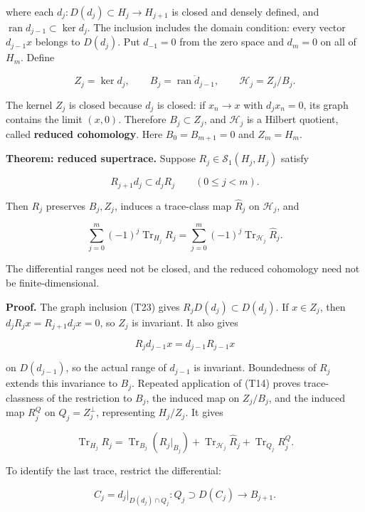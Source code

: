 \documentclass[
  11pt,
]{article}
\begin{document}
where each \(d_j:D(d_j)\subset H_j\to H_{j+1}\) is closed and densely
defined, and \(\operatorname{ran}d_{j-1}\subset\ker d_j\). The inclusion
includes the domain condition: every vector \(d_{j-1}x\) belongs to
\(D(d_j)\). Put \(d_{-1}=0\) from the zero space and \(d_m=0\) on all of
\(H_m\). Define

\[
Z_j=\ker d_j,\qquad B_j=\overline{\operatorname{ran}d_{j-1}},
\qquad \mathcal H_j=Z_j/B_j.                                \tag{T22}
\]

The kernel \(Z_j\) is closed because \(d_j\) is closed: if \(x_n\to x\)
with \(d_jx_n=0\), its graph contains the limit \((x,0)\). Therefore
\(B_j\subset Z_j\), and \(\mathcal H_j\) is a Hilbert quotient, called
\textbf{reduced cohomology}. Here \(B_0=B_{m+1}=0\) and \(Z_m=H_m\).

\textbf{Theorem: reduced supertrace.} Suppose
\(R_j\in\mathcal S_1(H_j,H_j)\) satisfy

\[
R_{j+1}d_j\subset d_jR_j\qquad(0\leq j<m).                   \tag{T23}
\]

Then \(R_j\) preserves \(B_j,Z_j\), induces a trace-class map
\(\widehat R_j\) on \(\mathcal H_j\), and

\[
\sum_{j=0}^m(-1)^j\operatorname{Tr}_{H_j}R_j
=\sum_{j=0}^m(-1)^j\operatorname{Tr}_{\mathcal H_j}\widehat R_j.
                                                                    \tag{T24}
\]

The differential ranges need not be closed, and the reduced cohomology
need not be finite-dimensional.

\textbf{Proof.} The graph inclusion (T23) gives
\(R_jD(d_j)\subset D(d_j)\). If \(x\in Z_j\), then
\(d_jR_jx=R_{j+1}d_jx=0\), so \(Z_j\) is invariant. It also gives

\[
R_jd_{j-1}x=d_{j-1}R_{j-1}x
\]

on \(D(d_{j-1})\), so the actual range of \(d_{j-1}\) is invariant.
Boundedness of \(R_j\) extends this invariance to \(B_j\). Repeated
application of (T14) proves trace-classness of the restriction to
\(B_j\), the induced map on \(Z_j/B_j\), and the induced map \(R_j^Q\)
on \(Q_j=Z_j^\perp\), representing \(H_j/Z_j\). It gives

\[
\operatorname{Tr}_{H_j}R_j
=\operatorname{Tr}_{B_j}(R_j|_{B_j})
+\operatorname{Tr}_{\mathcal H_j}\widehat R_j
+\operatorname{Tr}_{Q_j}R_j^Q.                              \tag{T25}
\]

To identify the last trace, restrict the differential:

\[
C_j=d_j|_{D(d_j)\cap Q_j}:Q_j\supset D(C_j)\longrightarrow B_{j+1}.
\]
\end{document}
